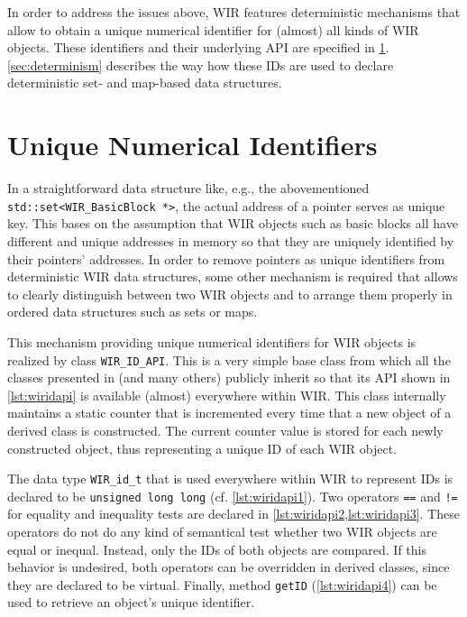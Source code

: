 In order to address the issues above, \gls{WIR} features deterministic mechanisms that allow to obtain a unique numerical identifier for (almost) all kinds of \gls{WIR} objects.
These identifiers and their underlying \gls{API} are specified in \cref{sec:ids}.
\cref{sec:determinism} describes the way how these IDs are used to declare deterministic set- and map-based data structures.


\section{Unique Numerical Identifiers}
\label{sec:ids}

In a straightforward data structure like, e.g., the abovementioned \texttt{std::set<WIR\_BasicBlock *>}, the actual address of a pointer serves as unique key.
This bases on the assumption that \gls{WIR} objects such as basic blocks all have different and unique addresses in memory so that they are uniquely identified by their pointers' addresses.
In order to remove pointers as unique identifiers from deterministic \gls{WIR} data structures, some other mechanism is required that allows to clearly distinguish between two \gls{WIR} objects and to arrange them properly in ordered data structures such as sets or maps.

This mechanism providing unique numerical identifiers for \gls{WIR} objects is realized by class \texttt{WIR\_ID\_API}.
This is a very simple base class from which all the classes presented in  (and many others) publicly inherit so that its \gls{API} shown in \cref{lst:wiridapi} is available (almost) everywhere within \gls{WIR}.
This class internally maintains a static counter that is incremented every time that a new object of a derived class is constructed.
The current counter value is stored for each newly constructed object, thus representing a unique ID of each \gls{WIR} object.

The data type \texttt{WIR\_id\_t} that is used everywhere within \gls{WIR} to represent IDs is declared to be \texttt{unsigned long long} (cf. \cref{lst:wiridapi1}).
Two operators \texttt{==} and \texttt{!=} for equality and inequality tests are declared in \cref{lst:wiridapi2,lst:wiridapi3}.
These operators do not do any kind of semantical test whether two \gls{WIR} objects are equal or inequal.
Instead, only the IDs of both objects are compared.
If this behavior is undesired, both operators can be overridden in derived classes, since they are declared to be virtual.
Finally, method \texttt{getID} (\cref{lst:wiridapi4}) can be used to retrieve an object's unique identifier.

